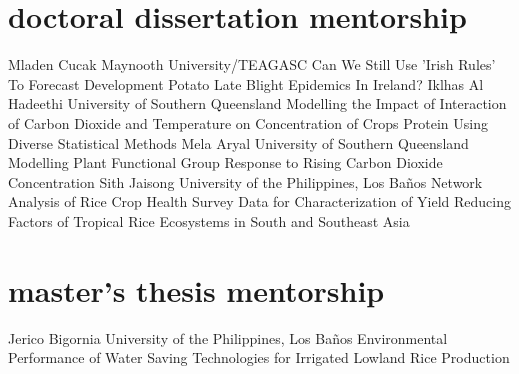 \section*{doctoral dissertation mentorship}
\begin{entrylist}
    {Mladen Cucak {}}
    {Maynooth University/TEAGASC}
    {Can We Still Use 'Irish Rules' To Forecast Development Potato Late Blight Epidemics In Ireland?}
    {Iklhas Al Hadeethi {}}
    {University of Southern Queensland}
    {Modelling the Impact of Interaction of Carbon Dioxide and Temperature on Concentration of Crops Protein Using Diverse Statistical Methods}
    {Mela Aryal {}}
    {University of Southern Queensland}
    {Modelling Plant Functional Group Response to Rising Carbon Dioxide Concentration}
    {Sith Jaisong {}}
    {University of the Philippines, Los Ba\~nos}
    {Network Analysis of Rice Crop Health Survey Data for Characterization of Yield Reducing Factors of Tropical Rice Ecosystems in South and Southeast Asia}
\end{entrylist}

\section*{master's thesis mentorship}
    \begin{entrylist}
        {Jerico Bigornia {}}
        {University of the Philippines, Los Ba\~nos}
        {Environmental Performance of Water Saving Technologies for Irrigated Lowland Rice Production}
\end{entrylist}
